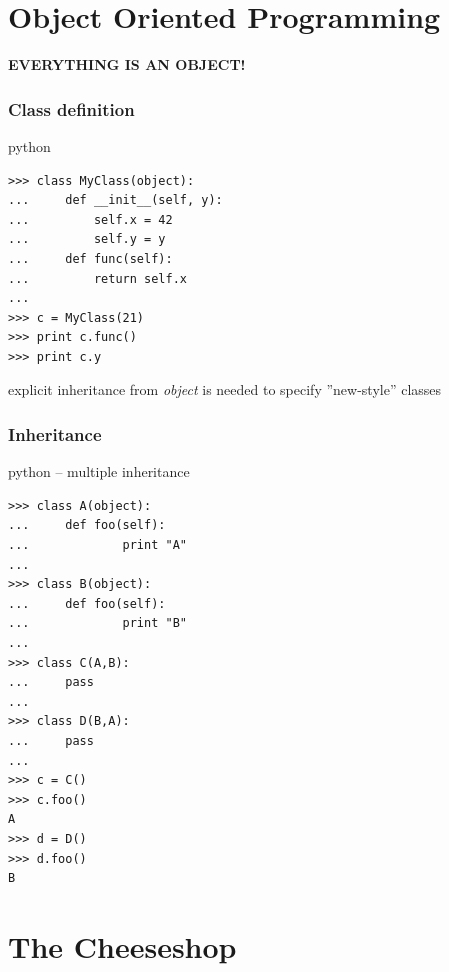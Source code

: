 \documentclass{beamer}
\begin{document}
\section{Object Oriented Programming}

\begin{frame}[plain]
	\begin{center}
	\huge{\textbf{EVERYTHING IS AN OBJECT!}}
	\end{center}
\end{frame}

\begin{frame}[fragile]
	\frametitle{Class definition}
	\begin{exampleblock}{python}
	\begin{lstlisting}
>>> class MyClass(object):
...     def __init__(self, y):
...         self.x = 42
...         self.y = y
...     def func(self):
...         return self.x
... 
>>> c = MyClass(21)
>>> print c.func()
>>> print c.y
	\end{lstlisting}
	\end{exampleblock}
	
	explicit inheritance from \emph{object} is needed to specify ''new-style'' classes
\end{frame}

\begin{frame}[fragile]
	\frametitle{Inheritance}
	\begin{exampleblock}{python -- multiple inheritance}
	\begin{lstlisting}
>>> class A(object):
...     def foo(self):
...             print "A"
...
>>> class B(object):
...     def foo(self):
...             print "B"
...
>>> class C(A,B):
...     pass
...
>>> class D(B,A):
...     pass
...
>>> c = C()
>>> c.foo()
A
>>> d = D()
>>> d.foo()
B	
	\end{lstlisting}
	\end{exampleblock}
\end{frame}

\section{The Cheeseshop}	%
\end{document}
